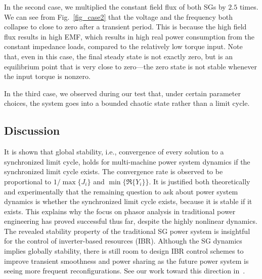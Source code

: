 In the second case, we multiplied the constant field flux of both SGs by $2.5$ times. We can see from Fig.~\ref{fig_case2} that the voltage and the frequency both collapse to close to zero after a transient period. This is because the high field flux results in high EMF, which results in high real power consumption from the constant impedance loads, compared to the relatively low torque input. Note that, even in this case, the final steady state is not exactly zero, but is an equilibrium point that is very close to zero---the zero state is not stable whenever the input torque is nonzero.

In the third case, we observed during our test that, under certain parameter choices, the system goes into a bounded chaotic state rather than a limit cycle. 



\subsection{Discussion}

It is shown that global stability, i.e., convergence of every solution to a synchronized limit cycle, holds for multi-machine power system dynamics if the synchronized limit cycle exists. The convergence rate is observed to be proportional to $1/\max\{J_i\}$ and $\min\{\Re\{Y_i\}\}$. It is justified both theoretically and experimentally that the remaining question to ask about power system dynamics is whether the synchronized limit cycle exists, because it is stable if it exists. This explains why the focus on phasor analysis in traditional power engineering has proved successful thus far, despite the highly nonlinear dynamics. The revealed stability property of the traditional SG power system is insightful for the control of inverter-based resources (IBR).
Although the SG dynamics implies globally stability, there is still room to design IBR control schemes to improve transient smoothness and power sharing as the future power system is seeing more frequent reconfigurations. See our work toward this direction in~\cite{jiang2024reference}. %

